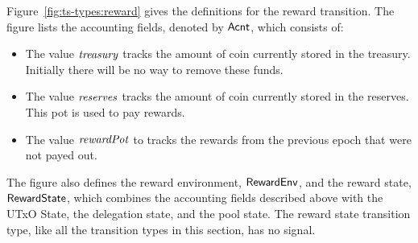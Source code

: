 Figure~\ref{fig:ts-types:reward} gives the definitions for the reward transition.
The figure lists the accounting fields, denoted by $\mathsf{Acnt}$, which consists of:
\begin{itemize}
  \item The value $\mathit{treasury}$ tracks the amount of coin currently stored in the treasury.
    Initially there will be no way to remove these funds.
  \item The value $\mathit{reserves}$ tracks the amount of coin currently stored in the reserves.
    This pot is used to pay rewards.
  \item The value $\mathit{rewardPot}$ to tracks the rewards from the previous epoch that were not
    payed out.
\end{itemize}
The figure also defines the reward environment, $\mathsf{RewardEnv}$, and the reward state,
$\mathsf{RewardState}$, which combines the accounting fields described above with the UTxO State,
the delegation state, and the pool state.
The reward state transition type, like all the transition types in this section, has no signal.

